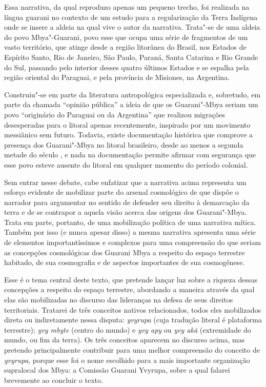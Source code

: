 \bigskip
\bigskip
Essa narrativa, da qual reproduzo apenas um pequeno trecho, foi
realizada na língua guarani no contexto de um estudo para a
regularização da Terra Indígena onde se insere a aldeia na qual vive o
autor da narrativa. Trata"-se de uma aldeia do povo Mbya"-Guarani, povo
esse que ocupa uma série de fragmentos de um vasto território, que
atinge desde a região litorânea do Brasil, nos Estados de Espírito
Santo, Rio de Janeiro, São Paulo, Paraná, Santa Catarina e Rio Grande
do Sul, passando pelo interior desses quatro últimos Estados e se
espalha pela região oriental do Paraguai, e pela província de
Misiones, na Argentina.

Construiu"-se em parte da literatura antropológica especializada e,
sobretudo, em parte da chamada ``opinião pública'' a ideia de que os
Guarani"-Mbya seriam um povo ``originário do Paraguai ou da Argentina''
que realizou migrações desesperadas para o litoral apenas recentemente,
inspirado por um movimento messiânico sem futuro. Todavia, existe
documentação histórica que comprove a presença dos Guarani"-Mbya no
litoral brasileiro, desde ao menos a segunda metade do século , e
nada na documentação permite afirmar com segurança que esse povo esteve
ausente do litoral em qualquer momento do período colonial.

Sem entrar nesse debate, cabe enfatizar que a narrativa acima representa
um esforço evidente de mobilizar parte do arsenal cosmológico de que
dispõe o narrador para argumentar no sentido de defender seu direito à
demarcação da terra e de se contrapor a aquela visão acerca das origens
dos Guarani"-Mbya. Trata em parte, portanto, de uma mobilização política
de uma narrativa mítica. Também por isso (e nunca apesar disso) a mesma
narrativa apresenta uma série de elementos importantíssimos e complexos
para uma compreensão do que seriam as concepções cosmológicas dos
Guarani Mbya a respeito do espaço terrestre habitado, de sua
cosmografia e de aspectos importantes de sua cosmogênese.

Esse é o tema central deste texto, que pretende lançar luz sobre a
riqueza dessas concepções a respeito do espaço terrestre, abordando a
maneira através da qual elas são mobilizadas no discurso das lideranças
na defesa de seus direitos territoriais. Tratarei de três conceitos
nativos relacionados, todos eles mobilizados direta ou indiretamente
nessa disputa: \emph{yvyrupa} (cuja tradução literal é plataforma terrestre);
\emph{yvy mbyte} (centro do mundo) e \emph{yvy apy} ou \emph{yvy akã} (extremidade do mundo,
ou fim da terra). Os três conceitos aparecem no discurso acima, mas
pretendo principalmente contribuir para uma melhor compreensão do
conceito de \emph{yvyrupa}, porque esse foi o nome escolhido para a mais
importante organização supralocal dos Mbya: a Comissão Guarani Yvyrupa,
sobre a qual falarei brevemente ao concluir o texto.

